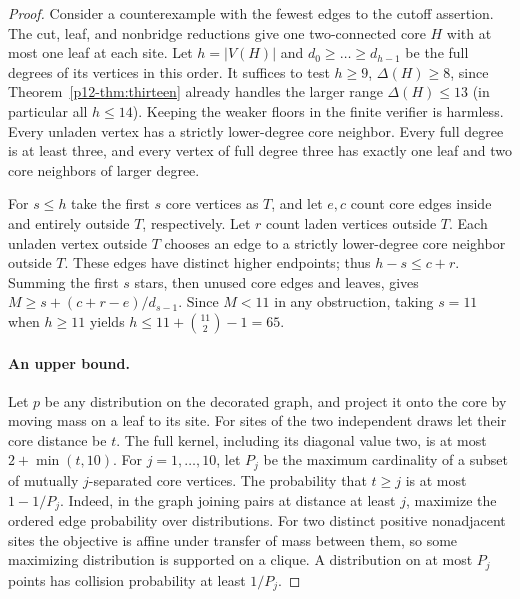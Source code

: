 \documentclass[11pt,a4paper]{article}
\begin{document}
\begin{proof}
Consider a counterexample with the fewest edges to the cutoff assertion.
The cut, leaf, and nonbridge reductions give one two-connected core $H$
with at most one leaf at each site. Let $h=|V(H)|$ and
$d_0\ge\dots\ge d_{h-1}$ be the full degrees of its vertices in
this order. It suffices to test $h\ge9$, $\Delta(H)\ge8$, since Theorem~\ref{p12-thm:thirteen} already handles the larger range $\Delta(H)\le13$ (in particular all $h\le14$). Keeping the weaker floors in the finite verifier is harmless. Every unladen vertex has a strictly lower-degree core neighbor.
Every full degree is at least three, and every vertex of full degree
three has exactly one leaf and two core neighbors of larger degree.

For $s\le h$ take the first $s$ core vertices as $T$, and let $e,c$
count core edges inside and entirely outside $T$, respectively. Let
$r$ count laden vertices outside $T$. Each unladen vertex outside $T$
chooses an edge to a strictly lower-degree core neighbor outside $T$.
These edges have distinct higher endpoints; thus $h-s\le c+r$.
Summing the first $s$ stars, then unused core edges and leaves, gives
$M\ge s+(c+r-e)/d_{s-1}$. Since $M<11$ in any obstruction, taking
$s=11$ when $h\ge11$ yields $h\le11+\binom{11}{2}-1=65$.

\paragraph{An upper bound.}
Let $p$ be any distribution on the decorated graph, and project it onto
the core by moving mass on a leaf to its site. For sites of the two
independent draws let their core distance be $t$. The full kernel,
including its diagonal value two, is at most $2+\min(t,10)$. For
$j=1,\ldots,10$, let $P_j$ be the maximum cardinality of a subset of
mutually $j$-separated core vertices. The probability that $t\ge j$ is
at most $1-1/P_j$. Indeed, in the graph joining pairs at distance at
least $j$, maximize the ordered edge probability over distributions.
For two distinct positive nonadjacent sites the objective is affine
under transfer of mass between them, so some maximizing distribution
is supported on a clique. A distribution on at most $P_j$ points has
collision probability at least $1/P_j$.


\end{proof}
\end{document}
